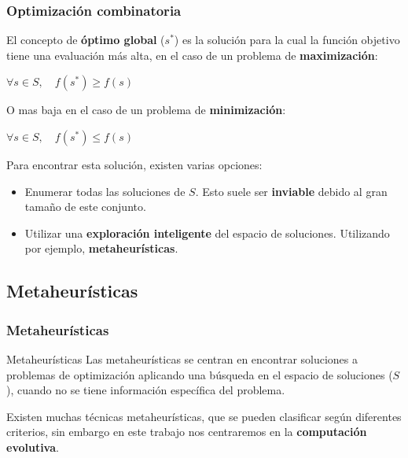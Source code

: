 \documentclass{beamer}
\begin{document}
\begin{frame}
\frametitle{Optimización combinatoria}

El concepto de \textbf{óptimo global} ($s^*$) es la solución para la cual la función objetivo tiene una evaluación más alta, en el caso de un problema de \textbf{maximización}:

\begin{center}
    $\forall s \in S, \quad f(s^*) \geq f(s)$ 
\end{center}

O mas baja en el caso de un problema de \textbf{minimización}:

\begin{center}
    $\forall s \in S, \quad f(s^*) \leq f(s)$ 
\end{center}

Para encontrar esta solución, existen varias opciones:

\begin{itemize}
    \item Enumerar todas las soluciones de $S$. Esto suele ser \textbf{inviable} debido al gran tamaño de este conjunto.
    \item Utilizar una \textbf{exploración inteligente} del espacio de soluciones. Utilizando por ejemplo, \textbf{metaheurísticas}.
\end{itemize}

\end{frame}

\subsection{Metaheurísticas}

\begin{frame}
\frametitle{Metaheurísticas}

\begin{block}{Metaheurísticas}
 Las metaheurísticas se centran en encontrar soluciones a problemas de optimización aplicando una búsqueda en el espacio de soluciones ($S$), cuando no se tiene información específica del problema.
\end{block}

\bigskip

Existen muchas técnicas metaheurísticas, que se pueden clasificar según diferentes criterios, sin embargo en este trabajo nos centraremos en la \textbf{computación evolutiva}.

\end{frame}
\end{document}
